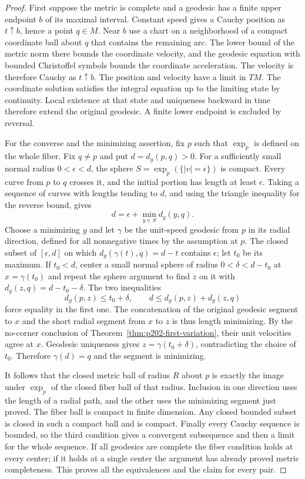 \documentclass[11pt,oneside,openany]{book}
\theoremstyle{plain}
\theoremstyle{definition}
\theoremstyle{remark}
\begin{document}
\begin{proof}
First suppose the metric is complete and a geodesic has a finite
upper endpoint \(b\) of its maximal interval. Constant speed gives
a Cauchy position as \(t\uparrow b\), hence a point \(q\in M\).
Near \(b\) use a chart on a neighborhood of a compact coordinate
ball about \(q\) that contains the remaining arc. The lower bound
of the metric norm there bounds the coordinate velocity, and
the geodesic equation with bounded Christoffel symbols bounds
the coordinate acceleration. The velocity is therefore Cauchy
as \(t\uparrow b\). The position and velocity have a limit in
\(TM\). The coordinate solution satisfies the integral equation
up to the limiting state by continuity. Local existence at that
state and uniqueness backward in time therefore extend the
original geodesic.
A finite lower endpoint is excluded by reversal.

For the converse and the minimizing assertion, fix \(p\) such
that \(\exp_p\) is defined on the whole fiber. Fix \(q\ne p\)
and put \(d=d_g(p,q)>0\). For a sufficiently small normal
radius \(0<\epsilon<d\), the sphere
\(S=\exp_p(\{\lvert v\rvert=\epsilon\})\) is compact. Every curve
from \(p\) to \(q\) crosses it, and the initial portion has
length at least \(\epsilon\). Taking a sequence of curves with
lengths tending to \(d\), and using the triangle inequality for
the reverse bound, gives
\[
 d=\epsilon+\min_{y\in S}d_g(y,q).
\]
Choose a minimizing \(y\) and let \(\gamma\) be the unit-speed
geodesic from \(p\) in its radial direction, defined for all
nonnegative times by the assumption at \(p\). The closed subset
of \([\epsilon,d]\) on which
\(d_g(\gamma(t),q)=d-t\) contains \(\epsilon\); let \(t_0\) be
its maximum. If \(t_0<d\), center a small normal sphere of
radius \(0<\delta<d-t_0\) at \(x=\gamma(t_0)\) and repeat the
sphere argument to find \(z\) on it with
\(d_g(z,q)=d-t_0-\delta\).
The two inequalities
\[
 d_g(p,z)\le t_0+\delta,\qquad
 d\le d_g(p,z)+d_g(z,q)
\]
force equality in the first one. The concatenation of the
original geodesic segment to \(x\) and the short radial segment
from \(x\) to \(z\) is thus length minimizing. By the no-corner
conclusion of Theorem~\ref{thm:p202-first-variation}, their unit
velocities agree at \(x\). Geodesic uniqueness gives
\(z=\gamma(t_0+\delta)\), contradicting the choice of \(t_0\).
Therefore \(\gamma(d)=q\) and the segment is minimizing.

It follows that the closed metric ball of radius \(R\) about \(p\)
is exactly the image under \(\exp_p\) of the closed fiber ball
of that radius. Inclusion in one direction uses the length of a
radial path, and the other uses the minimizing segment just proved.
The fiber ball is compact in finite dimension. Any closed bounded
subset is closed in such a compact ball and is compact.
Finally every Cauchy sequence is bounded, so the third condition
gives a convergent subsequence and then a limit for the whole
sequence. If all geodesics are complete the fiber condition
holds at every center; if it holds at a single center the
argument has already proved metric completeness. This proves all
the equivalences and the claim for every pair.
\end{proof}
\end{document}
